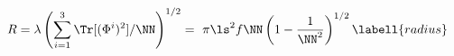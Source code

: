 \begin{equation}
R=\lambda\left(\sum_{i=1}^3\Tr[(\Phi^i)^2]/\NN\right)^{1/2}=\
\pi\ls^2f\NN\left(1-{1\over \NN^2}\right)^{1/2} \labell{radius}
\end{equation}

